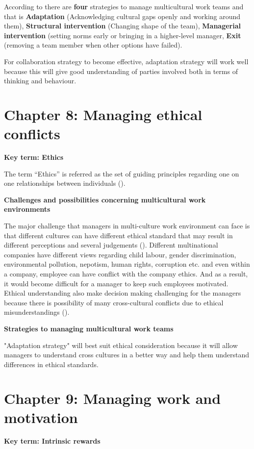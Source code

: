\documentclass{article}
\begin{document}
According to \cite{brett2009managing} there are \textbf{four} strategies to manage multicultural work teams and that is \textbf{Adaptation} (Acknowledging cultural gaps openly and working around them), \textbf{Structural intervention} (Changing shape of the team), \textbf{Managerial intervention} (setting norms early or bringing in a higher-level manager, \textbf{Exit} (removing a team member when other options have failed). 

For collaboration strategy to become effective, adaptation strategy will work well because this will give good understanding of parties involved both in terms of thinking and behaviour.



\section*{Chapter 8: Managing ethical conflicts}
\textbf{Key term: Ethics}

The term “Ethics” is referred as the set of guiding principles regarding one on one relationships between individuals (\cite[p.~236]{steers2013management}).

\textbf{Challenges and possibilities concerning multicultural work environments}

The major challenge that managers in multi-culture work environment can face is that different cultures can have different ethical standard that may result in different perceptions and several judgements (\cite{dimitrova}). Different multinational companies have different views regarding child labour, gender discrimination, environmental pollution, nepotism, human rights, corruption etc. and even within a company, employee can have conflict with the company ethics. And as a result, it would become difficult for a manager to keep such employees motivated. Ethical understanding also make decision making challenging for the managers because there is possibility of many cross-cultural conflicts due to ethical misunderstandings (\cite{paul_et_al}).

\textbf{Strategies to managing multicultural work teams}

"Adaptation strategy" will best suit ethical consideration because it will allow managers to understand cross cultures in a better way and help them understand differences in ethical standards.

\section*{Chapter 9: Managing work and motivation}
\textbf{Key term: Intrinsic rewards}
\end{document}
